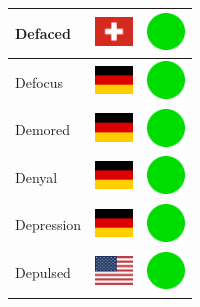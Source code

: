 \documentclass[12pt, a4paper, twoside]{report}
\begin{document}
\begin{center}
\begin{longtable}{|p{5cm}|p{2cm}|p{2cm}|}
Defaced & \includegraphics[width=1cm]{4x3/ch} & \includegraphics[width=1cm]{likes/y} \\ \hline
Defocus & \includegraphics[width=1cm]{4x3/de} & \includegraphics[width=1cm]{likes/y} \\ \hline
Demored & \includegraphics[width=1cm]{4x3/de} & \includegraphics[width=1cm]{likes/y} \\ \hline
Denyal & \includegraphics[width=1cm]{4x3/de} & \includegraphics[width=1cm]{likes/y} \\ \hline
Depression & \includegraphics[width=1cm]{4x3/de} & \includegraphics[width=1cm]{likes/y} \\ \hline
Depulsed & \includegraphics[width=1cm]{4x3/us} & \includegraphics[width=1cm]{likes/y} \\ \hline

\end{longtable}
\end{center}
\end{document}
